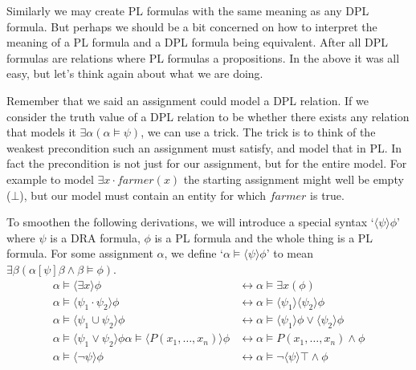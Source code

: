\documentclass[12pt]{article}
\begin{document}
Similarly we may create PL formulas with the same meaning as any DPL formula. But perhaps we should be a bit concerned on how to interpret the meaning of a PL formula and a DPL formula being equivalent. After all DPL formulas are relations where PL formulas a propositions. In the above it was all easy, but let's think again about what we are doing.

Remember that we said an assignment could model a DPL relation. If we consider the truth value of a DPL relation to be whether there exists any relation that models it $\exists\alpha(\alpha\models\psi)$, we can use a trick. The trick is to think of the weakest precondition such an assignment must satisfy, and model that in PL. In fact the precondition is not just for our assignment, but for the entire model. For example to model $\exists x\cdot farmer(x)$ the starting assignment might well be empty ($\bot$), but our model must contain an entity for which $farmer$ is true.

To smoothen the following derivations, we will introduce a special syntax `$\langle\psi\rangle\phi$' where $\psi$ is a DRA formula, $\phi$ is a PL formula and the whole thing is a PL formula. For some assignment $\alpha$, we define `$\alpha\models\langle\psi\rangle\phi$' to mean $\exists\beta(\alpha[\psi]\beta \wedge \beta\models\phi)$.
%
\begin{align}
\alpha\models\langle\exists x\rangle\phi
 & \leftrightarrow \alpha\models\exists x (\phi) \label{conv_exists}\\
\alpha\models\langle\psi_1\cdot\psi_2\rangle\phi
 & \leftrightarrow \alpha\models\langle\psi_1\rangle\langle\psi_2\rangle\phi \label{conv_and}\\
\alpha\models\langle\psi_1 \cup \psi_2\rangle\phi
 & \leftrightarrow \alpha\models\langle\psi_1\rangle\phi \vee \langle\psi_2\rangle\phi \label{conv_or}\\
 \alpha\models\langle\psi_1 \vee \psi_2\rangle\phi
\alpha\models\langle P(x_1,\dots,x_n)\rangle\phi
 & \leftrightarrow \alpha\models P(x_1,\dots,x_n) \wedge \phi \label{conv_pred}\\
\alpha\models\langle\neg\psi\rangle\phi
 & \leftrightarrow \alpha\models \neg\langle\psi\rangle\top \wedge \phi \label{conv_neg}
\end{align}
\end{document}
